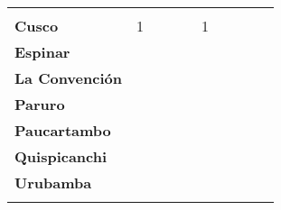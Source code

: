 \begin{tabular}{lccccccccc}
	&\cellcolor[HTML]{FCC46C}
	&\cellcolor[HTML]{FCC46C}
	&\cellcolor[HTML]{FCC46C}\\
	\textbf{Cusco}     												
	&1
	&\cellcolor[HTML]{FCC46C}
	&\cellcolor[HTML]{FCC46C}
	&\cellcolor[HTML]{FCC46C}
	&1
	&\cellcolor[HTML]{FCC46C}
	&\cellcolor[HTML]{FCC46C}
	&\cellcolor[HTML]{FCC46C}\\								
	\textbf{Espinar}       					             							
	&\cellcolor[HTML]{FCC46C}					
	&\cellcolor[HTML]{FCC46C}
	&\cellcolor[HTML]{FCC46C}					
	&\cellcolor[HTML]{FCC46C}
	&\cellcolor[HTML]{FCC46C}					
	&\cellcolor[HTML]{FCC46C}
	&\cellcolor[HTML]{FCC46C}
	&\cellcolor[HTML]{FCC46C}\\	
	\textbf{La Convención}      													
	&\cellcolor[HTML]{FCC46C}
	&\cellcolor[HTML]{FCC46C}
	&\cellcolor[HTML]{FCC46C}
	&\cellcolor[HTML]{FCC46C}
	&\cellcolor[HTML]{FCC46C}
	&\cellcolor[HTML]{FCC46C}
	&\cellcolor[HTML]{FCC46C}
	&\cellcolor[HTML]{FCC46C}\\	
	\textbf{Paruro}                            					
	&\cellcolor[HTML]{FCC46C}					
	&\cellcolor[HTML]{FCC46C}					
	&\cellcolor[HTML]{FCC46C}					
	&\cellcolor[HTML]{FCC46C}					
	&\cellcolor[HTML]{FCC46C}
	&\cellcolor[HTML]{FCC46C} 					
	&\cellcolor[HTML]{FCC46C}
	&\cellcolor[HTML]{FCC46C}\\
	\textbf{Paucartambo}               		                       					
	&\cellcolor[HTML]{FCC46C}					
	&\cellcolor[HTML]{FCC46C}
	&\cellcolor[HTML]{FCC46C}					
	&\cellcolor[HTML]{FCC46C}
	&\cellcolor[HTML]{FCC46C}					
	&\cellcolor[HTML]{FCC46C}
	&\cellcolor[HTML]{FCC46C}
	&\cellcolor[HTML]{FCC46C}\\
	\textbf{Quispicanchi}     															
	&\cellcolor[HTML]{FCC46C}
	&\cellcolor[HTML]{FCC46C}
	&\cellcolor[HTML]{FCC46C}
	&\cellcolor[HTML]{FCC46C}
	&\cellcolor[HTML]{FCC46C}
	&\cellcolor[HTML]{FCC46C}
	&\cellcolor[HTML]{FCC46C}
	&\cellcolor[HTML]{FCC46C}\\
	\textbf{Urubamba}  																
	&\cellcolor[HTML]{FCC46C}
	&\cellcolor[HTML]{FCC46C}
	&\cellcolor[HTML]{FCC46C}
	&\cellcolor[HTML]{FCC46C}
	&\cellcolor[HTML]{FCC46C}
	&\cellcolor[HTML]{FCC46C}
	&\cellcolor[HTML]{FCC46C}
	&\cellcolor[HTML]{FCC46C}\\						
	&\multicolumn{1}{l}{}                       &\multicolumn{1}{l}{}            &\multicolumn{1}{l}{}                         
	&\multicolumn{1}{l}{}                       &\multicolumn{1}{l}{}            &\multicolumn{1}{l}{}                       &\multicolumn{1}{l}{}                       &\multicolumn{1}{l}{}            			    
\end{tabular}